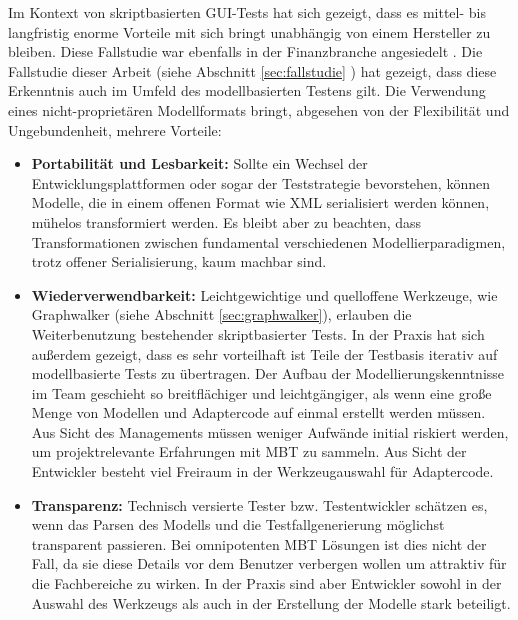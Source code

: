 Im Kontext von skriptbasierten GUI-Tests hat sich gezeigt, dass es mittel- bis langfristig enorme Vorteile mit sich bringt unabhängig von einem Hersteller zu bleiben. Diese Fallstudie war ebenfalls in der Finanzbranche angesiedelt \cite{graham_experiences_2012}. Die Fallstudie dieser Arbeit (siehe Abschnitt \ref{sec:fallstudie} ) hat gezeigt, dass diese Erkenntnis auch im Umfeld des modellbasierten Testens gilt. Die Verwendung eines nicht-proprietären Modellformats bringt, abgesehen von der Flexibilität und Ungebundenheit, mehrere Vorteile:

\begin{itemize}
\item \textbf{Portabilität und Lesbarkeit:} Sollte ein Wechsel der Entwicklungsplattformen oder sogar der Teststrategie bevorstehen, können Modelle, die in einem offenen Format wie XML serialisiert werden können, mühelos transformiert werden. Es bleibt aber zu beachten, dass Transformationen zwischen fundamental verschiedenen Modellierparadigmen, trotz offener Serialisierung, kaum machbar sind.
\item \textbf{Wiederverwendbarkeit:} Leichtgewichtige und quelloffene Werkzeuge, wie Graphwalker (siehe Abschnitt \ref{sec:graphwalker}), erlauben die Weiterbenutzung bestehender skriptbasierter Tests. In der Praxis hat sich außerdem gezeigt, dass es sehr vorteilhaft ist Teile der Testbasis iterativ auf modellbasierte Tests zu übertragen. Der Aufbau der Modellierungskenntnisse im Team geschieht so breitflächiger und leichtgängiger, als wenn eine große Menge von Modellen und Adaptercode auf einmal erstellt werden müssen. Aus Sicht des Managements müssen weniger Aufwände initial riskiert werden, um projektrelevante Erfahrungen mit \Gls{MBT} zu sammeln. Aus Sicht der Entwickler besteht viel Freiraum in der Werkzeugauswahl für Adaptercode.
\item \textbf{Transparenz:} Technisch versierte Tester bzw. Testentwickler schätzen es, wenn das Parsen des Modells und die Testfallgenerierung möglichst transparent passieren. Bei omnipotenten \Gls{MBT} Lösungen ist dies nicht der Fall, da sie diese Details vor dem Benutzer verbergen wollen um attraktiv für die Fachbereiche zu wirken. In der Praxis sind aber Entwickler sowohl in der Auswahl des Werkzeugs als auch in der Erstellung der Modelle stark beteiligt.
\end{itemize}



